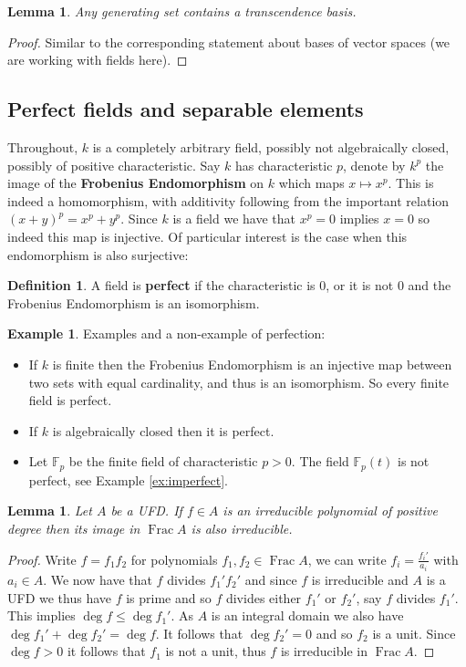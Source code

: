 \documentclass[12pt]{article}
\theoremstyle{plain}
\newtheorem{lemma}[thm]{Lemma}
\theoremstyle{definition}
\newtheorem{defn}[thm]{Definition} %
\newtheorem{example}[thm]{Example}
\newcommand{\bb}[1]{\mathbb{#1}}
\begin{document}
\begin{lemma}
Any generating set contains a transcendence basis.
\end{lemma}
\begin{proof}
Similar to the corresponding statement about bases of vector spaces (we are working with fields here).
\end{proof}
%
\subsection{Perfect fields and separable elements}
Throughout, $k$ is a completely arbitrary field, possibly not algebraically closed, possibly of positive characteristic.
Say $k$ has characteristic $p$, denote by $k^p$ the image of the \textbf{Frobenius Endomorphism} on $k$ which maps $x \mapsto x^p$. This is indeed a homomorphism, with additivity following from the important relation $(x + y)^p = x^p + y^p$. Since $k$ is a field we have that $x^p = 0$ implies $x = 0$ so indeed this map is injective. Of particular interest is the case when this endomorphism is also surjective:
\begin{defn}
A field is \textbf{perfect} if the characteristic is $0$, or it is not $0$ and the Frobenius Endomorphism is an isomorphism.
\end{defn}
\begin{example}
Examples and a non-example of perfection:
\begin{itemize}
    \item If $k$ is finite then the Frobenius Endomorphism is an injective map between two sets with equal cardinality, and thus is an isomorphism. So every finite field is perfect.
    \item If $k$ is algebraically closed then it is perfect.
    \item Let $\bb{F}_p$ be the finite field of characteristic $p > 0$. The field $\bb{F}_p(t)$ is not perfect, see Example \ref{ex:imperfect}.
\end{itemize}
\end{example}
\begin{lemma}
\label{lem:irred_UFD}
Let $A$ be a UFD. If $f \in A$ is an irreducible polynomial of positive degree then its image in $\operatorname{Frac}A$ is also irreducible.
\end{lemma}
\begin{proof}
Write $f = f_1f_2$ for polynomials $f_1,f_2 \in \operatorname{Frac}A$, we can write $f_i = \frac{f_i'}{a_i}$ with $a_i \in A$. We now have that $f$ divides $f_1'f_2'$ and since $f$ is irreducible and $A$ is a UFD we thus have $f$ is prime and so $f$ divides either $f_1'$ or $f_2'$, say $f$ divides $f_1'$. This implies $\operatorname{deg}f \leq \operatorname{deg}f_1'$.  As $A$ is an integral domain we also have $\operatorname{deg}f_1' + \operatorname{deg}f_2' = \operatorname{deg}f$. It follows that $\operatorname{deg}f_2' = 0$ and so $f_2$ is a unit. Since $\operatorname{deg}f > 0$ it follows that $f_1$ is not a unit, thus $f$ is irreducible in $\operatorname{Frac}A$.
\end{proof}
\end{document}

